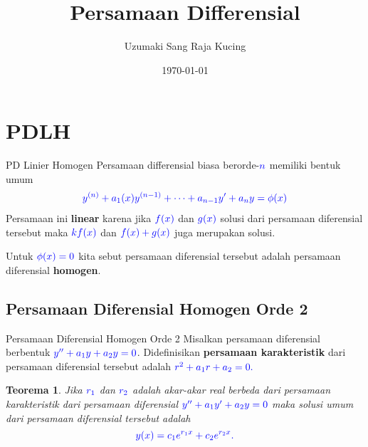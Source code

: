 \documentclass{beamer}
\title[Persamaan Differensial]{Persamaan Differensial} %
\author{Uzumaki Sang Raja Kucing} %
\institute[ITB] %
{
Institut Teknologi Bandung \\ %
\medskip
\textit{nagato.uzumaki17@yahoo.com} %
}
\date{\today} %
\newtheorem{teorema}{Teorema}
\begin{document}
\begin{frame}
\titlepage %
\end{frame}
\section{PDLH}
\begin{frame}{PD Linier Homogen}
Persamaan differensial biasa berorde-$\color{blue}n$ memiliki bentuk umum
\begin{align*}
\color{blue} y^{(n)}+a_1(x)y^{(n-1)}+\cdots+a_{n-1}y'+a_ny=\phi(x)
\end{align*}
Persamaan ini \textbf{linear} karena jika $\color{blue}f(x)$ dan $\color{blue}g(x)$ solusi dari persamaan diferensial tersebut maka $\color{blue}kf(x)$ dan $\color{blue}f(x)+g(x)$ juga merupakan solusi. 

Untuk $\color{blue}\phi(x)=0$ kita sebut persamaan diferensial tersebut adalah persamaan diferensial \textbf{homogen}.
\end{frame}
\subsection{Persamaan Diferensial Homogen Orde 2}
\begin{frame}{Persamaan Diferensial Homogen Orde 2}
	Misalkan persamaan diferensial berbentuk $\color{blue}y''+a_1y+a_2y=0$. \pause
	Didefinisikan \textbf{persamaan karakteristik } dari persamaan diferensial tersebut adalah $\color{blue} r^2+a_1r+a_2=0.$ \pause 
	\begin{teorema}
		Jika $\color{blue}r_1$ dan $\color{blue}r_2$ adalah akar-akar real berbeda dari persamaan karakteristik dari persamaan diferensial $\color{blue}y''+a_1y'+a_2y=0$ maka solusi umum dari persamaan diferensial tersebut adalah $$\color{blue}y(x)=c_1e^{r_1x}+c_2e^{r_2x}.$$
	\end{teorema} \pause 
\end{frame}
\end{document}

